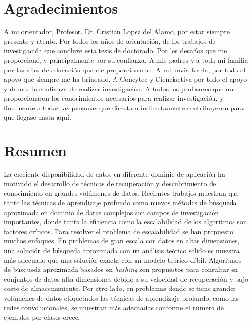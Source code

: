 \chapter*{Agradecimientos}

A mi orientador, Profesor. Dr. Cristian Lopez del Alamo, por estar siempre presente y atento. Por todos los años de orientación, de los trabajos de investigación que concluye esta tesis de doctorado. Por los desafíos que me proporcionó, y principalmente por su confianza. A mis padres y a toda mi familia por los años de educación que me proporcionaron. A mi  novia  Karla, por todo el apoyo que siempre me ha brindado. A Concytec y Cienciactiva por todo el apoyo y darnos la confianza de realizar investigación.  A todos los profesores que nos proporcionaron los conocimientos necesarios para realizar investigación, y finalmente a todas las personas que directa o indirectamente contribuyeron para que llegase hasta aquí.





\chapter*{Resumen}


La creciente disponibilidad de datos en diferente dominio de aplicación ha motivado el desarrollo de técnicas de recuperación y descubrimiento de conocimiento en grandes volúmenes de datos.   Recientes trabajos muestran que tanto las técnicas de aprendizaje profundo como  nuevos métodos de búsqueda aproximada en dominio de datos complejos son campos de investigación importantes, donde tanto la eficiencia como la  escalabilidad de los algoritmos son factores críticos. Para resolver el problema de escalabilidad se han propuesto muchos enfoques. En problemas de gran escala con datos en altas dimensiones, una solución de búsqueda aproximada con un análisis teórico solido se muestra más adecuado que una solución exacta con un modelo teórico débil.    Algoritmos de búsqueda aproximada  basados en \textit{hashing} son propuestos para consultar en conjuntos de datos  alta dimensiones debido a su velocidad de recuperación y bajo costo de almacenamiento.  Por otro lado, en problemas donde se tiene grandes volúmenes de datos etiquetados las técnicas de aprendizaje profundo, como las redes convolucionales, se muestran más adecuadas conforme el número de ejemplos por clases crece.

